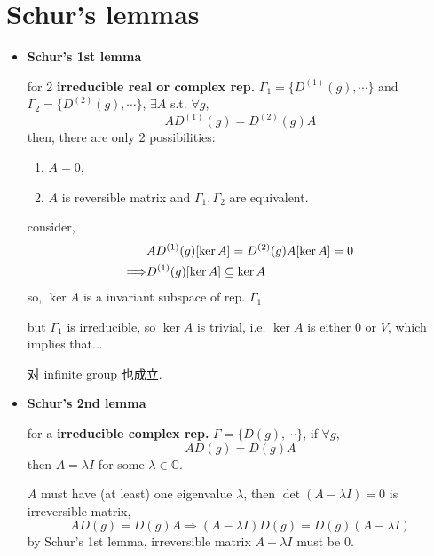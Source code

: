 \section{Schur's lemmas}
\begin{itemize}
	\item \textbf{Schur’s 1st lemma}
	
	for 2 \textbf{irreducible real or complex rep.} $\Gamma_1 = \{D^{(1)}(g), \cdots\}$ and $\Gamma_2 = \{D^{(2)}(g), \cdots\}$, $\exists A$ s.t. $\forall g$,
	\begin{equation}
		A D^{(1)}(g) = D^{(2)}(g) A
	\end{equation}
	then, there are only 2 possibilities:
	\begin{enumerate}
		\item $A = 0$,
		
		\item $A$ is reversible matrix and $\Gamma_1, \Gamma_2$ are equivalent.
	\end{enumerate}
	
	\begin{tcolorbox}[title=proof:]
		consider,
		\begin{align}
			& A D^{(1)}(g)[\ker A] = D^{(2)}(g) A[\ker A] = 0 \notag \\
			\Longrightarrow & D^{(1)}(g)[\ker A] \subseteq \ker A
		\end{align}
		so, $\ker A$ is a invariant subspace of rep. $\Gamma_1$
		
		but $\Gamma_1$ is irreducible, so $\ker A$ is trivial, i.e. $\ker A$ is either $0$ or $V$, which implies that...
	\end{tcolorbox}
	
	对 infinite group 也成立.
	
	\item \textbf{Schur’s 2nd lemma}
	
	for a \textbf{irreducible complex rep.} $\Gamma = \{D(g), \cdots\}$, if $\forall g$,
	\begin{equation}
		A D(g) = D(g) A
	\end{equation}
	then $A = \lambda I$ for some $\lambda \in \mathbb{C}$.
	
	\begin{tcolorbox}[title=proof:]
		$A$ must have (at least) one eigenvalue $\lambda$, then $\det(A - \lambda I) = 0$ is irreversible matrix,
		\begin{equation}
			A D(g) = D(g) A \Longrightarrow (A - \lambda I) D(g) = D(g) (A - \lambda I)
		\end{equation}
		by Schur’s 1st lemma, irreversible matrix $A - \lambda I$ must be $0$.
	\end{tcolorbox}
	

\end{itemize}
